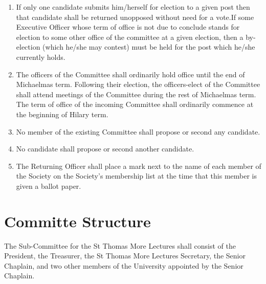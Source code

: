 \documentclass[11pt]{article}
\begin{document}
\begin{enumerate}
\item If only one candidate submits him/herself for election to a given post then that candidate shall be returned unopposed without need for a vote.If some Executive Officer whose term of office is not due to conclude stands for election to some other office of the committee at a given election, then a by-election (which he/she may contest) must be held for the post which he/she currently holds.
\item The officers of the Committee shall ordinarily hold office until the end of Michaelmas term. Following their election, the officers-elect of the Committee shall attend meetings of the Committee during the rest of Michaelmas term. The term of office of the incoming Committee shall ordinarily commence at the beginning of Hilary term.
\item No member of the existing Committee shall propose or second any candidate.
\item No candidate shall propose or second another candidate.
\item The Returning Officer shall place a mark next to the name of each member of the Society on the Society's membership list at the time that this member is given a ballot paper.
\end{enumerate}
\section{Committe Structure}
The Sub-Committee for the St Thomas More Lectures shall consist of the President, the Treasurer, the St Thomas More Lectures Secretary, the Senior Chaplain, and two other members of the University appointed by the Senior Chaplain.
\end{document}

